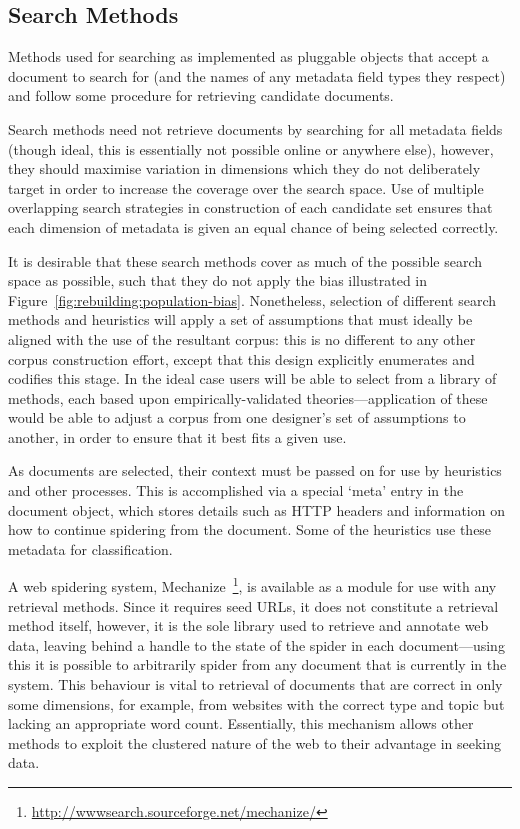 \subsection{Search Methods}
Methods used for searching as implemented as pluggable objects that accept a document to search for (and the names of any metadata field types they respect) and follow some procedure for retrieving candidate documents.

Search methods need not retrieve documents by searching for all metadata fields (though ideal, this is essentially not possible online or anywhere else), however, they should maximise variation in dimensions which they do not deliberately target in order to increase the coverage over the search space.  Use of multiple overlapping search strategies in construction of each candidate set ensures that each dimension of metadata is given an equal chance of being selected correctly.

It is desirable that these search methods cover as much of the possible search space as possible, such that they do not apply the bias illustrated in Figure~\ref{fig:rebuilding:population-bias}.  Nonetheless, selection of different search methods and heuristics will apply a set of assumptions that must ideally be aligned with the use of the resultant corpus: this is no different to any other corpus construction effort, except that this design explicitly enumerates and codifies this stage.  In the ideal case users will be able to select from a library of methods, each based upon empirically-validated theories---application of these would be able to adjust a corpus from one designer's set of assumptions to another, in order to ensure that it best fits a given use.

As documents are selected, their context must be passed on for use by heuristics and other processes.  This is accomplished via a special `meta' entry in the document object, which stores details such as HTTP headers and information on how to continue spidering from the document.  Some of the heuristics use these metadata for classification.

A web spidering system, Mechanize~\footnote{\url{http://wwwsearch.sourceforge.net/mechanize/}}, is available as a module for use with any retrieval methods.  Since it requires seed URLs, it does not constitute a retrieval method itself, however, it is the sole library used to retrieve and annotate web data, leaving behind a handle to the state of the spider in each document---using this it is possible to arbitrarily spider from any document that is currently in the system.  This behaviour is vital to retrieval of documents that are correct in only some dimensions, for example, from websites with the correct type and topic but lacking an appropriate word count.  Essentially, this mechanism allows other methods to exploit the clustered nature of the web to their advantage in seeking data.


